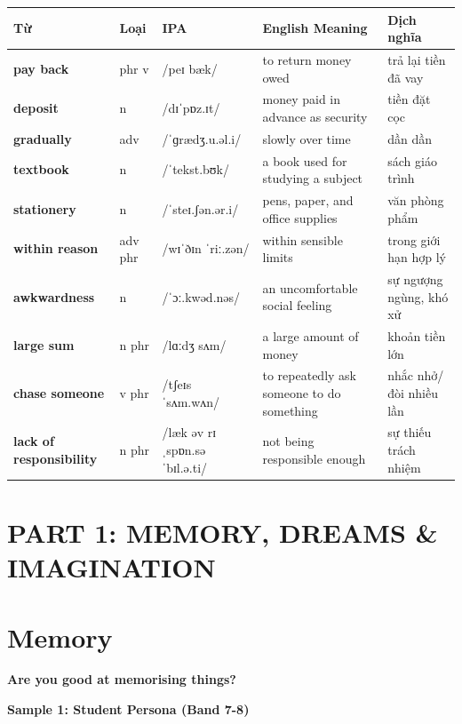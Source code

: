 \vspace{0.8em}
\begin{center}
\renewcommand{\arraystretch}{1.65}
\begin{tabularx}{\textwidth}{|V{0.22\textwidth}|C{0.07\textwidth}|I{0.20\textwidth}|Y|V{0.18\textwidth}|}
\hline
{}
\textbf{Từ} & \textbf{Loại} & \textbf{IPA} & \textbf{English Meaning} & \textbf{Dịch nghĩa} \\
\hline
\textbf{pay back} & phr v & /peɪ bæk/ & to return money owed & trả lại tiền đã vay \\ \hline
\textbf{deposit} & n & /dɪˈpɒz.ɪt/ & money paid in advance as security & tiền đặt cọc \\ \hline
\textbf{gradually} & adv & /ˈɡrædʒ.u.əl.i/ & slowly over time & dần dần \\ \hline
\textbf{textbook} & n & /ˈtekst.bʊk/ & a book used for studying a subject & sách giáo trình \\ \hline
\textbf{stationery} & n & /ˈsteɪ.ʃən.ər.i/ & pens, paper, and office supplies & văn phòng phẩm \\ \hline
\textbf{within reason} & adv phr & /wɪˈðɪn ˈriː.zən/ & within sensible limits & trong giới hạn hợp lý \\ \hline
\textbf{awkwardness} & n & /ˈɔː.kwəd.nəs/ & an uncomfortable social feeling & sự ngượng ngùng, khó xử \\ \hline
\textbf{large sum} & n phr & /lɑːdʒ sʌm/ & a large amount of money & khoản tiền lớn \\ \hline
\textbf{chase someone} & v phr & /tʃeɪs ˈsʌm.wʌn/ & to repeatedly ask someone to do something & nhắc nhở/đòi nhiều lần \\ \hline
\textbf{lack of responsibility} & n phr & /læk əv rɪˌspɒn.səˈbɪl.ə.ti/ & not being responsible enough & sự thiếu trách nhiệm \\ \hline
\end{tabularx}
\end{center}

\newpage

\section*{PART 1: MEMORY, DREAMS \& IMAGINATION}

\section{Memory}
\begin{ieltsquestion}
\textbf{Are you good at memorising things?}
\end{ieltsquestion}
\textbf{Sample 1: Student Persona (Band 7-8)}

